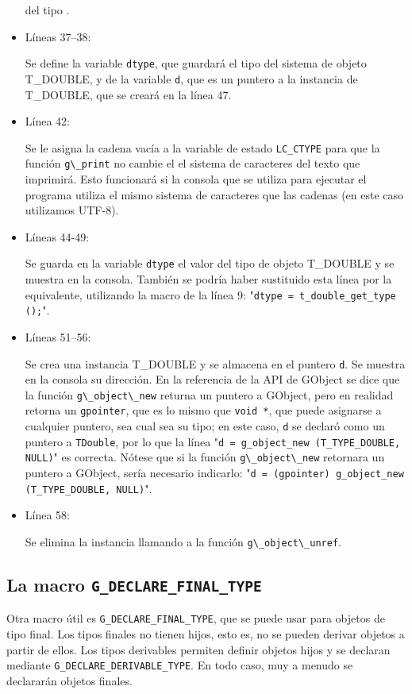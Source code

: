 \begin{itemize}
  del tipo .
\item Líneas 37--38:\par
  Se define la variable \texttt{dtype}, que guardará el tipo del sistema de objeto \textsf{T\_DOUBLE}, y de la
  variable \texttt{d}, que es un puntero a la instancia de \textsf{T\_DOUBLE}, que se creará en la línea 47.
\item Línea 42:\par
  Se le asigna la cadena vacía a la variable de estado \texttt{LC\_CTYPE} para que la función
  \passthrough{\lstinline!g\_print!} no cambie el el sistema de caracteres del texto que imprimirá.
  Esto funcionará si la consola que se utiliza para ejecutar el programa utiliza el mismo sistema de caracteres
  que las cadenas (en este caso utilizamos UTF-8).
\item Líneas 44-49:\par
  Se guarda en la variable \texttt{dtype} el valor del tipo de objeto \textsf{T\_DOUBLE} y se muestra en la consola.
  También se podría haber sustituido esta línea por la equivalente, utilizando la macro de la línea 9:
  "\texttt{dtype = t\_double\_get\_type ();}".
\item Líneas 51--56:\par
  Se crea una instancia \textsf{T\_DOUBLE} y se almacena en el puntero \texttt{d}. Se muestra en la consola su
  dirección. En la referencia de la API de \textsf{GObject} se dice que la función
  \passthrough{\lstinline!g\_object\_new!} returna un puntero a \textsf{GObject}, pero en realidad retorna un
  \texttt{gpointer}, que es lo mismo que \texttt{void *}, que puede asignarse a cualquier puntero, sea cual sea
  su tipo; en este caso, \texttt{d} se declaró como un puntero a \texttt{TDouble}, por lo que la línea
  "\texttt{d = g\_object\_new (T\_TYPE\_DOUBLE, NULL)}" es correcta. Nótese que si la función
  \passthrough{\lstinline!g\_object\_new!} retornara un puntero a \textsf{GObject}, sería necesario indicarlo:
  "\texttt{d = (gpointer) g\_object\_new (T\_TYPE\_DOUBLE, NULL)}".
\item Línea 58:\par
  Se elimina la instancia llamando a la función \passthrough{\lstinline!g\_object\_unref!}.
\end{itemize}

\subsection{La macro \texttt{G\_DECLARE\_FINAL\_TYPE}}
Otra macro útil es \texttt{G\_DECLARE\_FINAL\_TYPE}, que se puede usar para objetos de tipo final.
Los tipos finales no tienen hijos, esto es, no se pueden derivar objetos a partir de ellos.
Los tipos derivables permiten definir objetos hijos y se declaran mediante \texttt{G\_DECLARE\_DERIVABLE\_TYPE}. En todo caso, muy a menudo se declararán  objetos finales.

